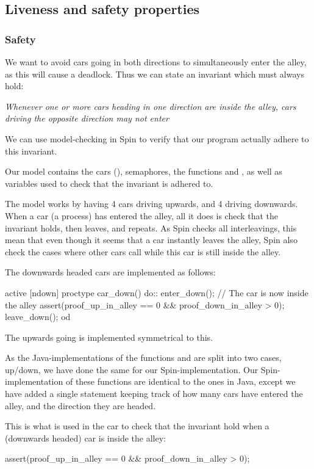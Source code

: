 \subsection{Liveness and safety properties}
\label{sub:all-proof}
\subsubsection{Safety}
We want to avoid cars going in both directions to simultaneously enter the alley, as this will cause a deadlock. Thus we can state an invariant which must always hold:


\emph{Whenever one or more cars heading in one direction are inside the alley, cars driving the opposite direction may not enter}


We can use model-checking in Spin to verify that our program actually adhere to this invariant.

Our model contains the cars (), semaphores, the functions  and , as well as variables used to check that the invariant is adhered to.

The model works by having 4 cars driving upwards, and 4 driving downwards. When a car (a process) has entered the alley, all it does is check that the invariant holds, then leaves, and repeats. As Spin checks all interleavings, this mean that even though it seems that a car instantly leaves the alley, Spin also check the cases where other cars call  while this car is still inside the alley.

The downwards headed cars are implemented as follows:
\begin{promela}
active [ndown] proctype car_down(){
	do::
		enter_down();
		// The car is now inside the alley
		assert(proof_up_in_alley == 0 && proof_down_in_alley > 0);
		leave_down();
	od
}
\end{promela}

The upwards going is implemented symmetrical to this.

As the Java-implementations of the functions  and  are split into two cases, up/down, we have done the same for our Spin-implementation. Our Spin-implementation of these functions are identical to the ones in Java, except we have added a single statement keeping track of how many cars have entered the alley, and the direction they are headed.

This is what is used in the car  to check that the invariant hold when a (downwards headed) car is inside the alley:
\begin{promela}
assert(proof_up_in_alley == 0 && proof_down_in_alley > 0);
\end{promela}



